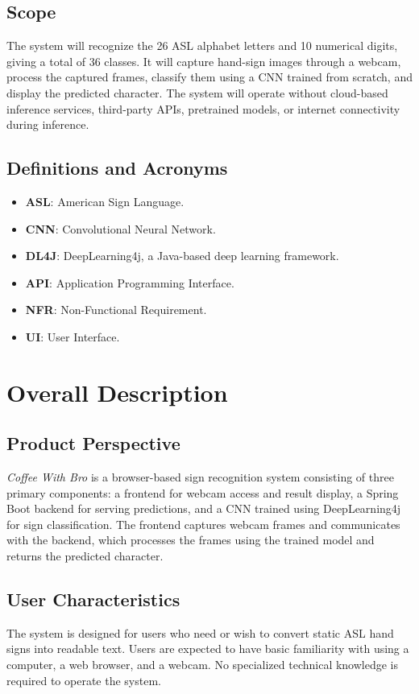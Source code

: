 \documentclass{article}
\begin{document}
\subsection{Scope}
The system will recognize the 26 ASL alphabet letters and 10 numerical digits, giving a total of 36 classes. It will capture hand-sign images through a webcam, process the captured frames, classify them using a CNN trained from scratch, and display the predicted character. The system will operate without cloud-based inference services, third-party APIs, pretrained models, or internet connectivity during inference.

\subsection{Definitions and Acronyms}
\begin{itemize}
    \item \textbf{ASL}: American Sign Language.
    \item \textbf{CNN}: Convolutional Neural Network.
    \item \textbf{DL4J}: DeepLearning4j, a Java-based deep learning framework.
    \item \textbf{API}: Application Programming Interface.
    \item \textbf{NFR}: Non-Functional Requirement.
    \item \textbf{UI}: User Interface.
\end{itemize}


\section{Overall Description}

\subsection{Product Perspective}
\textit{Coffee With Bro} is a browser-based sign recognition system consisting of three primary components: a frontend for webcam access and result display, a Spring Boot backend for serving predictions, and a CNN trained using DeepLearning4j for sign classification. The frontend captures webcam frames and communicates with the backend, which processes the frames using the trained model and returns the predicted character.

\subsection{User Characteristics}
The system is designed for users who need or wish to convert static ASL hand signs into readable text. Users are expected to have basic familiarity with using a computer, a web browser, and a webcam. No specialized technical knowledge is required to operate the system.
\end{document}
